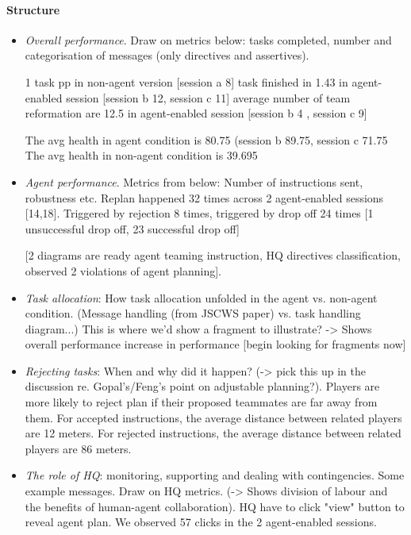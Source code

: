 \paragraph{Structure}
\begin{itemize}
\item  \textit{Overall performance}. Draw on metrics below: tasks completed, number and categorisation of messages (only directives and assertives).

1 task pp in non-agent version [session a 8] 
task finished in 1.43 in agent-enabled session [session b 12, session c 11]
average number of team reformation are 12.5 in agent-enabled session [session b 4 , session c 9]

The avg health in agent condition is 80.75 (session b 89.75, session c 71.75
The avg health in non-agent condition is 39.695

\item \textit{Agent performance}. Metrics from below: Number of instructions sent, robustness etc. 
Replan happened 32 times across 2 agent-enabled sessions [14,18]. Triggered by rejection 8 times, triggered by drop off 24 times [1 unsuccessful drop off, 23 successful drop off]


[2 diagrams are ready agent teaming instruction, HQ directives classification, observed 2 violations of agent planning]. 




\item \textit{Task allocation}: How task allocation unfolded in the agent vs. non-agent condition. (Message handling (from JSCWS paper) vs. task handling diagram...) This is where we'd show a fragment to illustrate? -> Shows overall performance increase in performance
[begin looking for fragments now]


\item \textit{Rejecting tasks}: When and why did it happen? (-> pick this up in the discussion re. Gopal's/Feng's point on adjustable planning?). 
Players are more likely to reject plan if their proposed teammates are far away from them.
For accepted instructions, the average distance between related players are 12 meters.
For rejected instructions, the average distance between related players are 86 meters.

\item \textit{The role of HQ}: monitoring, supporting and dealing with contingencies. Some example messages. Draw on HQ metrics. (-> Shows division of labour and the benefits of human-agent collaboration).
HQ have to click "view" button to reveal agent plan. We observed 57 clicks in the 2 agent-enabled sessions. 

\end{itemize} 
 
